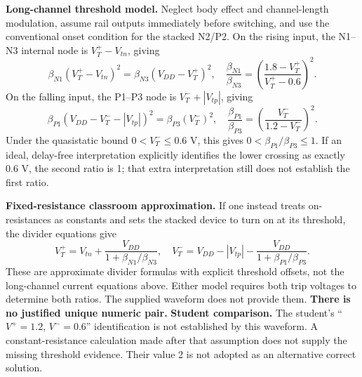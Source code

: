 \documentclass[10pt]{article}
\begin{document}
\textbf{Long-channel threshold model.} Neglect body effect and channel-length modulation, assume rail outputs immediately before switching, and use the conventional onset condition for the stacked N2/P2. On the rising input, the N1--N3 internal node is $V_T^+-V_{tn}$, giving
\[\beta_{N1}(V_T^+-V_{tn})^2=\beta_{N3}(V_{DD}-V_T^+)^2,
\quad\boxed{\frac{\beta_{N1}}{\beta_{N3}}=\left(\frac{1.8-V_T^+}{V_T^+-0.6}\right)^2}.\]
On the falling input, the P1--P3 node is $V_T^-+|V_{tp}|$, giving
\[\beta_{P1}(V_{DD}-V_T^--|V_{tp}|)^2=\beta_{P3}(V_T^-)^2,
\quad\boxed{\frac{\beta_{P1}}{\beta_{P3}}=\left(\frac{V_T^-}{1.2-V_T^-}\right)^2}.\]
Under the quasistatic bound $0<V_T^-\leq0.6$ V, this gives $0<\beta_{P1}/\beta_{P3}\leq1$. If an ideal, delay-free interpretation explicitly identifies the lower crossing as exactly 0.6 V, the second ratio is 1; that extra interpretation still does not establish the first ratio.

\textbf{Fixed-resistance classroom approximation.} If one instead treats on-resistances as constants and sets the stacked device to turn on at its threshold, the divider equations give
\[
V_T^+=V_{tn}+\frac{V_{DD}}{1+\beta_{N1}/\beta_{N3}},\quad
V_T^-=V_{DD}-|V_{tp}|-\frac{V_{DD}}{1+\beta_{P1}/\beta_{P3}}.
\]
These are approximate divider formulas with explicit threshold offsets, not the long-channel current equations above. Either model requires both trip voltages to determine both ratios. The supplied waveform does not provide them. \textbf{There is no justified unique numeric pair.}
\textbf{Student comparison.} The student's ``$V^+=1.2$, $V^-=0.6$'' identification is not established by this waveform. A constant-resistance calculation made after that assumption does not supply the missing threshold evidence. Their value 2 is not adopted as an alternative correct solution.
\end{document}

